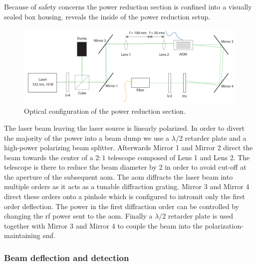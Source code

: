 Because of safety concerns the power reduction section is confined into a
visually sealed box housing.  reveals the
inside of the power reduction setup.
\begin{figure}[htb]
  \centering
  \includegraphics[width=\textwidth]{../figure/setup/power-reduction.pdf}
  \caption{Optical configuration of the power reduction section.
  }\label{fig:setup_power_reduction}
\end{figure}
The laser beam leaving the laser source is linearly polarized. In order to
divert the majority of the power into a beam dump we use a $\lambda/2$
retarder plate and a high-power polarizing beam splitter. Afterwards Mirror
\num{1} and Mirror \num{2} direct the beam towards the center of a $2:1$
telescope composed of Lens \num{1} and Lens \num{2}. The telescope is there to
reduce the beam diameter by \num{2} in order to avoid cut-off at the aperture
of the subsequent \gls{aom}. The \gls{aom} diffracts the laser beam into
multiple orders as it acts as a tunable diffraction grating. Mirror \num{3}
and Mirror \num{4} direct these orders onto a pinhole which is configured to
intromit only the first order deflection. The power in the first diffraction
order can be controlled by changing the \gls{rf} power sent to the \gls{aom}.
Finally a $\lambda/2$ retarder plate is used together with Mirror \num{3} and
Mirror \num{4} to couple the beam into the polarization-maintaining \gls{smf}.

\subsubsection{Beam deflection and detection}\label{subsec:setup_deflection_detection}

